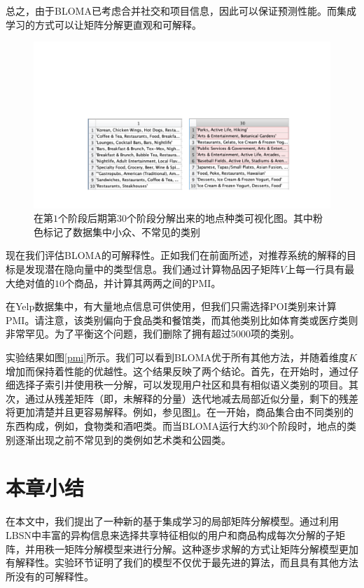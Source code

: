 总之，由于BLOMA已考虑合并社交和项目信息，因此可以保证预测性能。而集成学习的方式可以让矩阵分解更直观和可解释。


\begin{figure}[!t]
\centering
\includegraphics[width=\textwidth]{pics/factors.pdf}
\caption{在第$1$个阶段后期第$30$个阶段分解出来的地点种类可视化图。其中粉色标记了数据集中小众、不常见的类别} 
\label{factors}
\end{figure}


现在我们评估BLOMA的可解释性。正如我们在前面所述，对推荐系统的解释的目标是发现潜在隐向量中的类型信息。我们通过计算物品因子矩阵$V$上每一行具有最大绝对值的$10$个商品，并计算其两两之间的PMI。

在Yelp数据集中，有大量地点信息可供使用，但我们只需选择POI类别来计算PMI。请注意，该类别偏向于食品类和餐馆类，而其他类别比如体育类或医疗类则非常罕见。为了平衡这个问题，我们删除了拥有超过5000项的类别。

实验结果如图\ref{pmi}所示。我们可以看到BLOMA优于所有其他方法，并随着维度$ K $增加而保持着性能的优越性。这个结果反映了两个结论。首先，在开始时，通过仔细选择子索引并使用秩一分解，可以发现用户社区和具有相似语义类别的项目。其次，通过从残差矩阵（即，未解释的分量）迭代地减去局部近似分量，剩下的残差将更加清楚并且更容易解释。例如，参见图\ref{factors}。在一开始，商品集合由不同类别的东西构成，例如，食物类和酒吧类。而当BLOMA运行大约30个阶段时，地点的类别逐渐出现之前不常见到的类例如艺术类和公园类。





\section{本章小结}
\label{conclusion}
在本文中，我们提出了一种新的基于集成学习的局部矩阵分解模型。通过利用LBSN中丰富的异构信息来选择共享特征相似的用户和商品构成每次分解的子矩阵，并用秩一矩阵分解模型来进行分解。这种逐步求解的方式让矩阵分解模型更加有解释性。实验环节证明了我们的模型不仅优于最先进的算法，而且具有其他方法所没有的可解释性。
\newpage\mbox{}\thispagestyle{empty}\newpage


